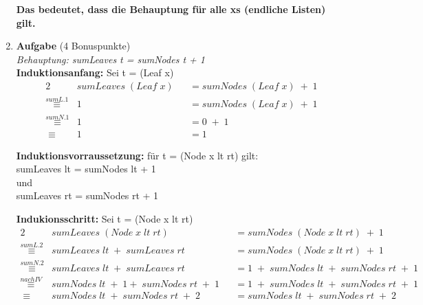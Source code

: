 \documentclass[11pt]{article}
\newcommand{\bonuspunke}[1]{{\small{ }(#1 Bonuspunkte)}}
\newcommand{\aufgabe}[1]{\item{\bf #1}}
\begin{document}
\begin{enumerate}
\vspace*{0.5cm}
\textbf{Das bedeutet, dass die Behauptung für alle xs (endliche Listen) gilt.}

\aufgabe{Aufgabe}\bonuspunke{4}\\
\vspace*{0.5cm}
\textit{Behauptung: sumLeaves t = sumNodes t + 1}\\
\textbf{Induktionsanfang:} Sei t = (Leaf x)
\begin{alignat*}{2}
&sumLeaves\phantom{.}(Leaf\phantom{.}x)&&=sumNodes\phantom{.}(Leaf\phantom{.}x)\phantom{.}+\phantom{.}1\\
\stackrel{sumL.1}{\equiv}&1&&=sumNodes\phantom{.}(Leaf\phantom{.}x)\phantom{.}+\phantom{.}1\\
\stackrel{sumN.1}{\equiv}&1 &&= 0\phantom{.}+\phantom{.}1\\
\equiv\phantom{.}&1&&=1
\end{alignat*}

\vspace*{0.5cm}
\textbf{Induktionsvorraussetzung:} für t = (Node x lt rt) gilt:\\
sumLeaves lt = sumNodes lt + 1\\
\phantom{Kriegel }und\\
sumLeaves rt = sumNodes rt + 1

\vspace*{0.5cm}
\textbf{Indukionsschritt:} Sei t = (Node x lt rt)
\begin{alignat*}{2}
&sumLeaves\phantom{.}(Node\phantom{.}x\phantom{.}lt\phantom{.}rt)&&=sumNodes\phantom{.}(Node\phantom{.}x\phantom{.}lt\phantom{.}rt)\phantom{.}+\phantom{.}1\\
\stackrel{sumL.2}{\equiv}&sumLeaves\phantom{.}lt\phantom{.}+\phantom{.}sumLeaves\phantom{.}rt&&=sumNodes\phantom{.}(Node\phantom{.}x\phantom{.}lt\phantom{.}rt)\phantom{.}+\phantom{.}1\\
\stackrel{sumN.2}{\equiv}&sumLeaves\phantom{.}lt\phantom{.}+\phantom{.}sumLeaves\phantom{.}rt&&=1\phantom{.}+\phantom{.}sumNodes\phantom{.}lt\phantom{.}+\phantom{.}sumNodes\phantom{.}rt\phantom{.}+\phantom{.}1\\
\stackrel{nach IV}{\equiv}&sumNodes\phantom{.}lt\phantom{.}+\phantom{.}1+\phantom{.}sumNodes\phantom{.}rt\phantom{.}+\phantom{.}1&&=1\phantom{.}+\phantom{.}sumNodes\phantom{.}lt\phantom{.}+\phantom{.}sumNodes\phantom{.}rt\phantom{.}+\phantom{.}1\\
\equiv\phantom{.}&sumNodes\phantom{.}lt\phantom{.}+\phantom{.}sumNodes\phantom{.}rt\phantom{.}+\phantom{.}2&&=sumNodes\phantom{.}lt\phantom{.}+\phantom{.}sumNodes\phantom{.}rt\phantom{.}+\phantom{.}2
\end{alignat*}


\end{enumerate}
\end{document}
